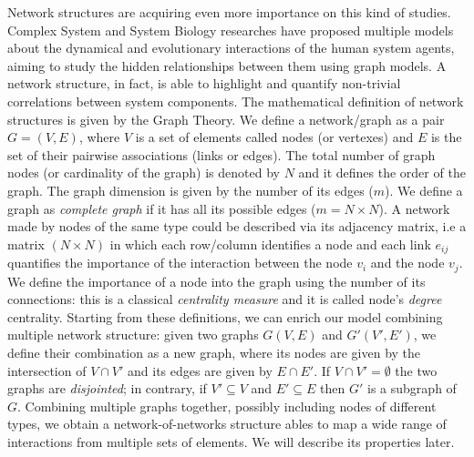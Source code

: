 \documentclass{standalone}
\begin{document}
Network structures are acquiring even more importance on this kind of studies.
Complex System and System Biology researches have proposed multiple models about the dynamical and evolutionary interactions of the human system agents, aiming to study the hidden relationships between them using graph models.
A network structure, in fact, is able to highlight and quantify non-trivial correlations between system components.
The mathematical definition of network structures is given by the Graph Theory.
We define a network/graph as a pair $G = (V, E)$, where $V$ is a set of elements called nodes (or vertexes) and $E$ is the set of their pairwise associations (links or edges).
The total number of graph nodes (or cardinality of the graph) is denoted by $N$ and it defines the order of the graph.
The graph dimension is given by the number of its edges ($m$).
We define a graph as \emph{complete graph} if it has all its possible edges ($m = N \times N$).
A network made by nodes of the same type could be described via its adjacency matrix, i.e a matrix $(N\times N)$ in which each row/column identifies a node and each link $e_{ij}$ quantifies the importance of the interaction between the node $v_i$ and the node $v_j$.
We define the importance of a node into the graph using the number of its connections: this is a classical \emph{centrality measure} and it is called node's \emph{degree} centrality.
Starting from these definitions, we can enrich our model combining multiple network structure: given two graphs $G(V, E)$ and $G'(V', E')$, we define their combination as a new graph, where its nodes are given by the intersection of $V\cap V'$ and its edges are given by $E\cap E'$.
If $V\cap V'=\emptyset$ the two graphs are \emph{disjointed}; in contrary, if $V'\subseteq V$ and $E'\subseteq E$ then $G'$ is a subgraph of $G$.
Combining multiple graphs together, possibly including nodes of different types, we obtain a network-of-networks structure ables to map a wide range of interactions from multiple sets of elements.
We will describe its properties later.
\end{document}
